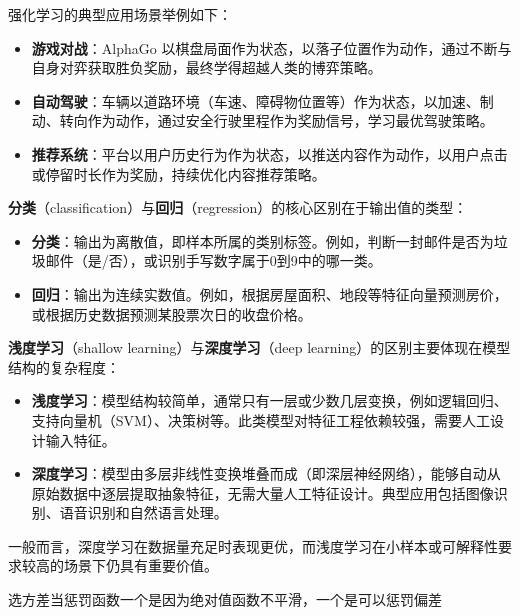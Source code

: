 \begin{note}
强化学习的典型应用场景举例如下：
\begin{itemize}
    \item \textbf{游戏对战}：AlphaGo 以棋盘局面作为状态，以落子位置作为动作，通过不断与自身对弈获取胜负奖励，最终学得超越人类的博弈策略。
    \item \textbf{自动驾驶}：车辆以道路环境（车速、障碍物位置等）作为状态，以加速、制动、转向作为动作，通过安全行驶里程作为奖励信号，学习最优驾驶策略。
    \item \textbf{推荐系统}：平台以用户历史行为作为状态，以推送内容作为动作，以用户点击或停留时长作为奖励，持续优化内容推荐策略。
\end{itemize}
\end{note}
\begin{note}
\textbf{分类}（classification）与\textbf{回归}（regression）的核心区别在于输出值的类型：
\begin{itemize}
    \item \textbf{分类}：输出为离散值，即样本所属的类别标签。例如，判断一封邮件是否为垃圾邮件（是/否），或识别手写数字属于0到9中的哪一类。
    \item \textbf{回归}：输出为连续实数值。例如，根据房屋面积、地段等特征向量预测房价，或根据历史数据预测某股票次日的收盘价格。
\end{itemize}
\end{note}

\begin{note}
\textbf{浅度学习}（shallow learning）与\textbf{深度学习}（deep learning）的区别主要体现在模型结构的复杂程度：
\begin{itemize}
    \item \textbf{浅度学习}：模型结构较简单，通常只有一层或少数几层变换，例如逻辑回归、支持向量机（SVM）、决策树等。此类模型对特征工程依赖较强，需要人工设计输入特征。
    \item \textbf{深度学习}：模型由多层非线性变换堆叠而成（即深层神经网络），能够自动从原始数据中逐层提取抽象特征，无需大量人工特征设计。典型应用包括图像识别、语音识别和自然语言处理。
\end{itemize}
一般而言，深度学习在数据量充足时表现更优，而浅度学习在小样本或可解释性要求较高的场景下仍具有重要价值。
\end{note}
\begin{dxtips}
  选方差当惩罚函数一个是因为绝对值函数不平滑，一个是可以惩罚偏差  
\end{dxtips}











